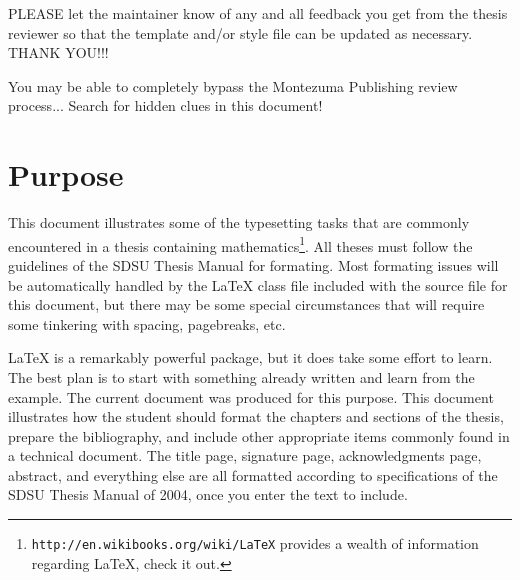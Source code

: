 PLEASE let the maintainer know of any and all feedback you get from
the thesis reviewer so that the template and/or style file can be
updated as necessary.  THANK YOU!!!

{\tiny You may be able to completely bypass the Montezuma Publishing
  review process...  Search for hidden clues in this document!}


\section{Purpose}

This document illustrates some of the typesetting tasks that are
commonly encountered in a thesis containing
mathematics\footnote{\texttt{http://en.wikibooks.org/wiki/LaTeX}\quad
  provides a wealth of information regarding \LaTeX, check it out.}.
All theses must follow the guidelines of the SDSU Thesis Manual for
formating.  Most formating issues will be automatically handled by the
\LaTeX{} class file included with the source file for this document,
but there may be some special circumstances that will require some
tinkering with spacing, pagebreaks, etc.

\LaTeX{} is a remarkably powerful package, but it does take some effort
to learn.  The best plan is to start with something already written
and learn from the example.  The current document was produced for
this purpose.  This document illustrates how the student should format
the chapters and sections of the thesis, prepare the bibliography, and
include other appropriate items commonly found in a technical
document.  The title page, signature page, acknowledgments page,
abstract, and everything else are all formatted according to
specifications of the SDSU Thesis Manual of 2004, once you enter the
text to include.

